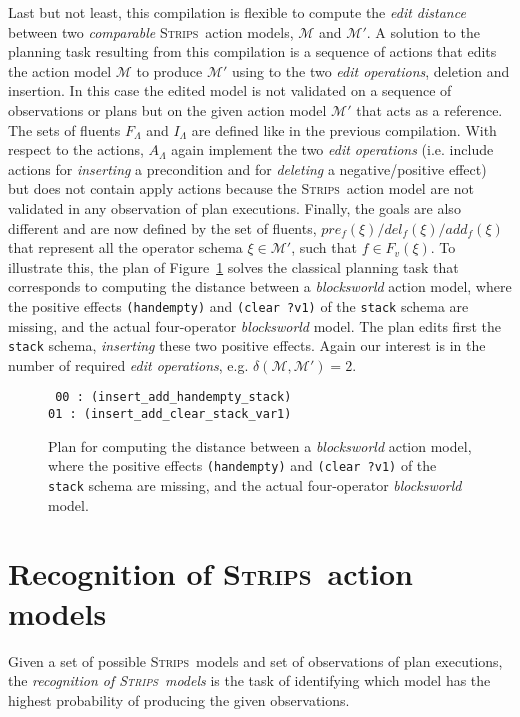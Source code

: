 \documentclass[3p,times]{elsarticle}
\newcommand{\strips}{\textsc{Strips}}     %
\begin{document}
Last but not least, this compilation is flexible to compute the {\em edit distance} between two {\em comparable} \strips\ action models, $\mathcal{M}$ and $\mathcal{M}'$. A solution to the planning task resulting from this compilation is a sequence of actions that edits the action model $\mathcal{M}$ to produce $\mathcal{M}'$ using to the two {\em edit operations}, deletion and insertion. In this case the edited model is not validated on a sequence of observations or plans but on the given action model $\mathcal{M}'$ that acts as a reference. The sets of fluents $F_{\Lambda}$ and $I_{\Lambda}$ are defined like in the previous compilation. With respect to the actions, $A_{\Lambda}$ again implement the two {\em edit operations} (i.e. include actions for {\em inserting} a precondition and for {\em deleting} a negative/positive effect) but does not contain apply actions because the \strips\ action model are not validated in any observation of plan executions. Finally, the goals are also different and are now defined by the set of fluents, $pre_f(\xi)/del_f(\xi)/add_f(\xi)$ that represent all the operator schema $\xi\in\mathcal{M'}$, such that $f\in F_v(\xi)$. To illustrate this, the plan of Figure~\ref{fig:plan-mdistance} solves the classical planning task that corresponds to computing the distance between a \emph{blocksworld} action model, where the positive effects {\tt\small (handempty)} and {\tt\small (clear ?v1)} of the {\tt\small stack} schema are missing, and the actual four-operator {\em blocksworld} model. The plan edits first the {\tt\small stack} schema, {\em inserting} these two positive effects. Again our interest is in the number of required {\em edit operations}, e.g. $\delta(\mathcal{M},\mathcal{M'})=2$. 

\begin{figure}[hbt!]
{\tt\small
00 : (insert\_add\_handempty\_stack)\\
01 : (insert\_add\_clear\_stack\_var1)
}
 \caption{\small Plan for computing the distance between a \emph{blocksworld} action model, where the positive effects {\tt\small (handempty)} and {\tt\small (clear ?v1)} of the {\tt\small stack} schema are missing, and the actual four-operator {\em blocksworld} model.}
\label{fig:plan-mdistance}
\end{figure}



\section{Recognition of \strips\ action models}
\label{sec:Section7}
Given a set of possible \strips\ models and set of observations of plan executions, the {\em recognition of \strips\ models} is the task of identifying which model has the highest probability of producing the given observations.
\end{document}
